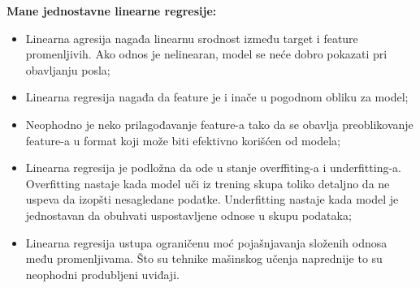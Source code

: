 \documentclass[fontsize=12bp, paper=a4]{scrarticle}
\begin{document}
\textbf{Mane jednostavne linearne regresije:}
\begin{itemize}
    \item Linearna agresija nagađa linearnu srodnost između target i feature promenljivih. Ako odnos je nelinearan, model se neće dobro pokazati pri obavljanju posla;
    \item Linearna regresija nagađa da feature je i inače u pogodnom obliku za model;
    \item Neophodno je neko prilagođavanje feature-a tako da se obavlja preoblikovanje feature-a u format koji može biti efektivno korišćen od modela;
    \item Linearna regresija je podložna da ode u stanje overffiting-a i underfitting-a. Overfitting nastaje kada model uči iz trening skupa toliko detaljno da ne uspeva da izopšti nesagledane podatke. Underfitting nastaje kada model je jednostavan da obuhvati uspostavljene odnose u skupu podataka;
    \item Linearna regresija ustupa ograničenu moć pojašnjavanja složenih odnosa među promenljivama. Što su tehnike mašinskog učenja naprednije to su neophodni produbljeni uviđaji.
\end{itemize}

\end{document}
